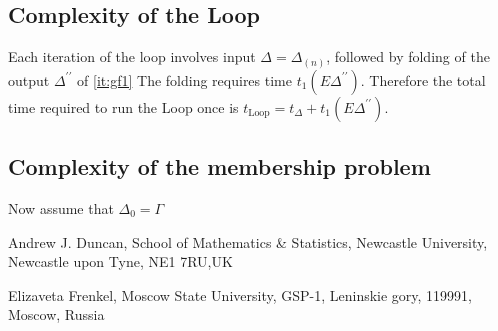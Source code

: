 \documentclass[a4paper,12pt]{article}
\newcommand{\G}{\Gamma }
\newcommand{\D}{\Delta }
\numberwithin{equation}{section}
\numberwithin{figure}{section}
\newcommand{\Loop}{\operatorname{Loop}}
\begin{document}
\subsection{Complexity of the Loop}\label{sub:loop}
Each iteration of the loop involves input $\D=\D_{(n)}$, followed by
folding of the output $\D^{\prime\prime}$ of \ref{it:gf1}
The folding requires time $t_1(E\D^{\prime\prime})$. Therefore the
total time required to run the Loop once is
 $t_{\Loop}= t_{\D}+t_1(E\D^{\prime\prime})$.



\subsection{Complexity of the membership problem}\label{sub:mp_complexity}
  
Now assume that $\D_{0}=\G$




\medskip
\noindent\textsf{Andrew J. Duncan, School of Mathematics \&
Statistics, Newcastle University, Newcastle upon Tyne, NE1 7RU,UK}


\noindent \textsf{Elizaveta Frenkel, Moscow State University,
GSP-1, Leninskie gory, 119991, Moscow, Russia}

\end{document}
